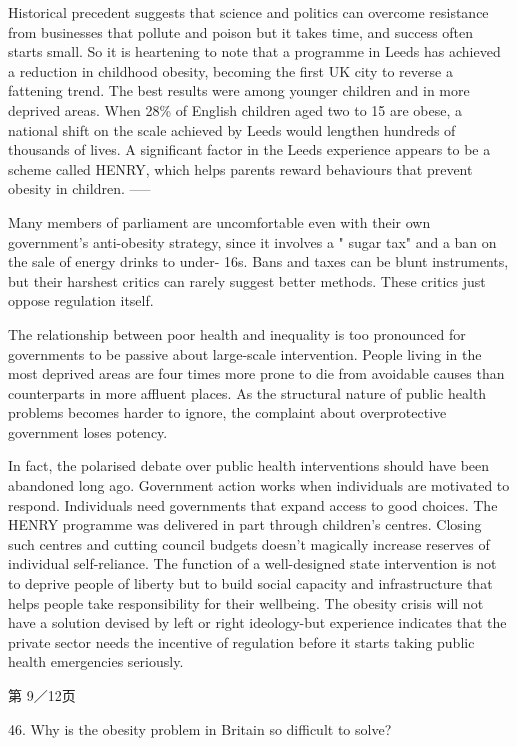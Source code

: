 \documentclass[UTF8,11pt]{ctexart}
\begin{document}
Historical precedent suggests that science and politics can overcome resistance from businesses that pollute and poison but it takes time, and success often starts small. So it is heartening to note that a programme in Leeds has achieved a reduction in childhood obesity, becoming the first UK city to reverse a fattening trend. The best results were among younger children and in more deprived areas. When 28\% of English children aged two to 15 are obese, a national shift on the scale achieved by Leeds would lengthen hundreds of thousands of lives. A significant factor in the Leeds experience appears to be a scheme called HENRY, which helps parents reward behaviours that prevent obesity in children. -----


Many members of parliament are uncomfortable even with their own government's anti-obesity strategy, since it involves a " sugar tax" and a ban on the sale of energy drinks to under- 16s. Bans and taxes can be blunt instruments, but their harshest critics can rarely suggest better methods. These critics just oppose regulation itself.


The relationship between poor health and inequality is too pronounced for governments to be passive about large-scale intervention. People living in the most deprived areas are four times more prone to die from avoidable causes than counterparts in more affluent places. As the structural nature of public health problems becomes harder to ignore, the complaint about overprotective government loses potency.


In fact, the polarised debate over public health interventions should have been abandoned long ago. Government action works when individuals are motivated to respond. Individuals need governments that expand access to good choices. The HENRY programme was delivered in part through children's centres. Closing such centres and cutting council budgets doesn't magically increase reserves of individual self-reliance. The function of a well-designed state intervention is not to deprive people of liberty but to build social capacity and infrastructure that helps people take responsibility for their wellbeing. The obesity crisis will not have a solution devised by left or right ideology-but experience indicates that the private sector needs the incentive of regulation before it starts taking public health emergencies seriously.


第 9／12页


46. Why is the obesity problem in Britain so difficult to solve?
\end{document}
